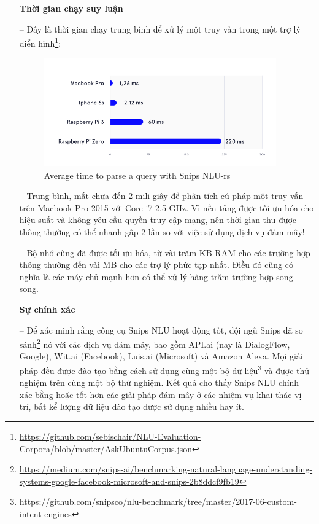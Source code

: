 \begin{itemize}
        \textbf{Thời gian chạy suy luận}

    \item[--] Đây là thời gian chạy trung bình để xử lý một truy vấn trong một trợ lý điển hình\footnote{\url{https://github.com/sebischair/NLU-Evaluation-Corpora/blob/master/AskUbuntuCorpus.json}}:

        \begin{figure}[htp]
            \centering
            \includegraphics[width=10cm]{images/ComparisonOfNLU/averageTime.png}
            \caption{Average time to parse a query with Snips NLU-rs}
            \label{fig:system-class-intent}
        \end{figure}

        \item[--]Trung bình, mất chưa đến 2 mili giây để phân tích cú pháp một truy vấn trên Macbook Pro 2015 với Core i7 2,5 GHz. Vì nền tảng được tối ưu hóa cho hiệu suất và không yêu cầu quyền truy cập mạng, nên thời gian thu được thông thường có thể nhanh gấp 2 lần so với việc sử dụng dịch vụ đám mây!

        \item[--]Bộ nhớ cũng đã được tối ưu hóa, từ vài trăm KB RAM cho các trường hợp thông thường đến vài MB cho các trợ lý phức tạp nhất. Điều đó cũng có nghĩa là các máy chủ mạnh hơn có thể xử lý hàng trăm trường hợp song song.

        \textbf{Sự chính xác}

        \item[--]Để xác minh rằng công cụ Snips NLU hoạt động tốt, đội ngũ Snips đã so sánh\footnote{\url{https://medium.com/snips-ai/benchmarking-natural-language-understanding-systems-google-facebook-microsoft-and-snips-2b8ddcf9fb19}} nó với các dịch vụ đám mây, bao gồm API.ai (nay là DialogFlow, Google), Wit.ai (Facebook), Luis.ai (Microsoft) và Amazon Alexa. Mọi giải pháp đều được đào tạo bằng cách sử dụng cùng một bộ dữ liệu\footnote{\url{https://github.com/snipsco/nlu-benchmark/tree/master/2017-06-custom-intent-engines}} và được thử nghiệm trên cùng một bộ thử nghiệm. Kết quả cho thấy Snips NLU chính xác bằng hoặc tốt hơn các giải pháp đám mây ở các nhiệm vụ khai thác vị trí, bất kể lượng dữ liệu đào tạo được sử dụng nhiều hay ít.


\end{itemize}
